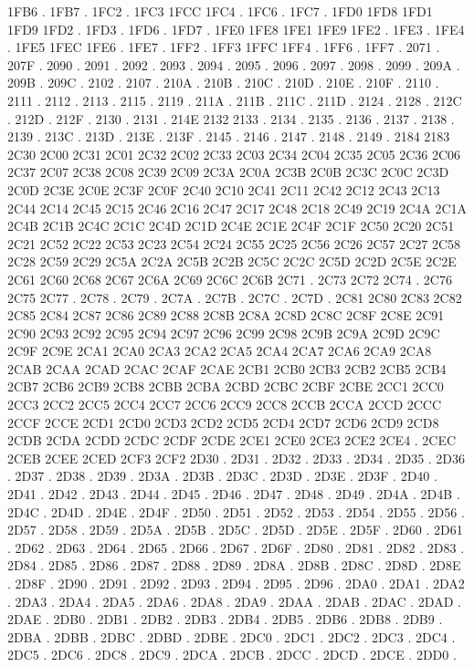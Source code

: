 1FB6 .
1FB7 .
1FC2 .
1FC3 1FCC
1FC4 .
1FC6 .
1FC7 .
1FD0 1FD8
1FD1 1FD9
1FD2 .
1FD3 .
1FD6 .
1FD7 .
1FE0 1FE8
1FE1 1FE9
1FE2 .
1FE3 .
1FE4 .
1FE5 1FEC
1FE6 .
1FE7 .
1FF2 .
1FF3 1FFC
1FF4 .
1FF6 .
1FF7 .
2071 .
207F .
2090 .
2091 .
2092 .
2093 .
2094 .
2095 .
2096 .
2097 .
2098 .
2099 .
209A .
209B .
209C .
2102 .
2107 .
210A .
210B .
210C .
210D .
210E .
210F .
2110 .
2111 .
2112 .
2113 .
2115 .
2119 .
211A .
211B .
211C .
211D .
2124 .
2128 .
212C .
212D .
212F .
2130 .
2131 .
214E 2132
2133 .
2134 .
2135 .
2136 .
2137 .
2138 .
2139 .
213C .
213D .
213E .
213F .
2145 .
2146 .
2147 .
2148 .
2149 .
2184 2183
2C30 2C00
2C31 2C01
2C32 2C02
2C33 2C03
2C34 2C04
2C35 2C05
2C36 2C06
2C37 2C07
2C38 2C08
2C39 2C09
2C3A 2C0A
2C3B 2C0B
2C3C 2C0C
2C3D 2C0D
2C3E 2C0E
2C3F 2C0F
2C40 2C10
2C41 2C11
2C42 2C12
2C43 2C13
2C44 2C14
2C45 2C15
2C46 2C16
2C47 2C17
2C48 2C18
2C49 2C19
2C4A 2C1A
2C4B 2C1B
2C4C 2C1C
2C4D 2C1D
2C4E 2C1E
2C4F 2C1F
2C50 2C20
2C51 2C21
2C52 2C22
2C53 2C23
2C54 2C24
2C55 2C25
2C56 2C26
2C57 2C27
2C58 2C28
2C59 2C29
2C5A 2C2A
2C5B 2C2B
2C5C 2C2C
2C5D 2C2D
2C5E 2C2E
2C61 2C60
2C68 2C67
2C6A 2C69
2C6C 2C6B
2C71 .
2C73 2C72
2C74 .
2C76 2C75
2C77 .
2C78 .
2C79 .
2C7A .
2C7B .
2C7C .
2C7D .
2C81 2C80
2C83 2C82
2C85 2C84
2C87 2C86
2C89 2C88
2C8B 2C8A
2C8D 2C8C
2C8F 2C8E
2C91 2C90
2C93 2C92
2C95 2C94
2C97 2C96
2C99 2C98
2C9B 2C9A
2C9D 2C9C
2C9F 2C9E
2CA1 2CA0
2CA3 2CA2
2CA5 2CA4
2CA7 2CA6
2CA9 2CA8
2CAB 2CAA
2CAD 2CAC
2CAF 2CAE
2CB1 2CB0
2CB3 2CB2
2CB5 2CB4
2CB7 2CB6
2CB9 2CB8
2CBB 2CBA
2CBD 2CBC
2CBF 2CBE
2CC1 2CC0
2CC3 2CC2
2CC5 2CC4
2CC7 2CC6
2CC9 2CC8
2CCB 2CCA
2CCD 2CCC
2CCF 2CCE
2CD1 2CD0
2CD3 2CD2
2CD5 2CD4
2CD7 2CD6
2CD9 2CD8
2CDB 2CDA
2CDD 2CDC
2CDF 2CDE
2CE1 2CE0
2CE3 2CE2
2CE4 .
2CEC 2CEB
2CEE 2CED
2CF3 2CF2
2D30 .
2D31 .
2D32 .
2D33 .
2D34 .
2D35 .
2D36 .
2D37 .
2D38 .
2D39 .
2D3A .
2D3B .
2D3C .
2D3D .
2D3E .
2D3F .
2D40 .
2D41 .
2D42 .
2D43 .
2D44 .
2D45 .
2D46 .
2D47 .
2D48 .
2D49 .
2D4A .
2D4B .
2D4C .
2D4D .
2D4E .
2D4F .
2D50 .
2D51 .
2D52 .
2D53 .
2D54 .
2D55 .
2D56 .
2D57 .
2D58 .
2D59 .
2D5A .
2D5B .
2D5C .
2D5D .
2D5E .
2D5F .
2D60 .
2D61 .
2D62 .
2D63 .
2D64 .
2D65 .
2D66 .
2D67 .
2D6F .
2D80 .
2D81 .
2D82 .
2D83 .
2D84 .
2D85 .
2D86 .
2D87 .
2D88 .
2D89 .
2D8A .
2D8B .
2D8C .
2D8D .
2D8E .
2D8F .
2D90 .
2D91 .
2D92 .
2D93 .
2D94 .
2D95 .
2D96 .
2DA0 .
2DA1 .
2DA2 .
2DA3 .
2DA4 .
2DA5 .
2DA6 .
2DA8 .
2DA9 .
2DAA .
2DAB .
2DAC .
2DAD .
2DAE .
2DB0 .
2DB1 .
2DB2 .
2DB3 .
2DB4 .
2DB5 .
2DB6 .
2DB8 .
2DB9 .
2DBA .
2DBB .
2DBC .
2DBD .
2DBE .
2DC0 .
2DC1 .
2DC2 .
2DC3 .
2DC4 .
2DC5 .
2DC6 .
2DC8 .
2DC9 .
2DCA .
2DCB .
2DCC .
2DCD .
2DCE .
2DD0 .
